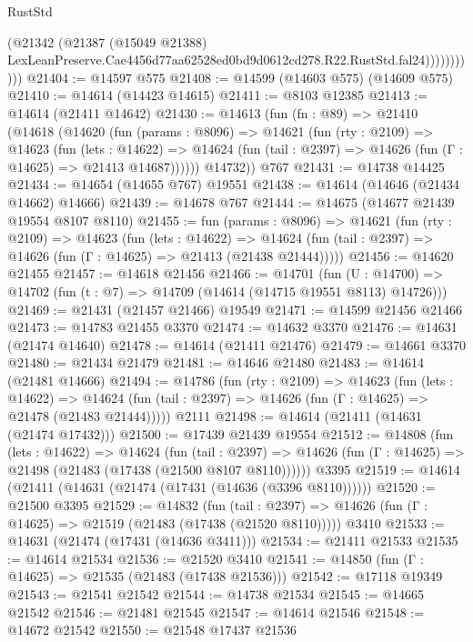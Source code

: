 \begin{lexlean}{RustStd}
\begin{coremodule}
                      (@21342
                        (@21387
                          (@15049 @21388)
                          LexLeanPreserve.Cae4456d77aa62528ed0bd9d0612cd278.R22.RustStd.fal24)))))))))))
@21404 := @14597 @575
@21408 := @14599 (@14603 @575) (@14609 @575)
@21410 := @14614 (@14423 @14615)
@21411 := @8103 @12385
@21413 := @14614 (@21411 @14642)
@21430 := @14613
    (fun (fn : @89) =>
    @21410
      (@14618
        (@14620
          (fun (params : @8096) =>
          @14621
            (fun (rty : @2109) =>
            @14623
              (fun (lets : @14622) =>
              @14624 (fun (tail : @2397) => @14626 (fun (Γ : @14625) => @21413 @14687))))))
        @14732))
    @767
@21431 := @14738 @14425
@21434 := @14654 (@14655 @767) @19551
@21438 := @14614 (@14646 (@21434 @14662) @14666)
@21439 := @14678 @767
@21444 := @14675 (@14677 @21439 @19554 @8107 @8110)
@21455 := fun (params : @8096) =>
  @14621
    (fun (rty : @2109) =>
    @14623
      (fun (lets : @14622) =>
      @14624 (fun (tail : @2397) => @14626 (fun (Γ : @14625) => @21413 (@21438 @21444)))))
@21456 := @14620 @21455
@21457 := @14618 @21456
@21466 := @14701
    (fun (U : @14700) => @14702 (fun (t : @7) => @14709 (@14614 (@14715 @19551 @8113) @14726)))
@21469 := @21431 (@21457 @21466) @19549
@21471 := @14599 @21456 @21466
@21473 := @14783 @21455 @3370
@21474 := @14632 @3370
@21476 := @14631 (@21474 @14640)
@21478 := @14614 (@21411 @21476)
@21479 := @14661 @3370
@21480 := @21434 @21479
@21481 := @14646 @21480
@21483 := @14614 (@21481 @14666)
@21494 := @14786
    (fun (rty : @2109) =>
    @14623
      (fun (lets : @14622) =>
      @14624 (fun (tail : @2397) => @14626 (fun (Γ : @14625) => @21478 (@21483 @21444)))))
    @2111
@21498 := @14614 (@21411 (@14631 (@21474 @17432)))
@21500 := @17439 @21439 @19554
@21512 := @14808
    (fun (lets : @14622) =>
    @14624
      (fun (tail : @2397) =>
      @14626 (fun (Γ : @14625) => @21498 (@21483 (@17438 (@21500 @8107 @8110))))))
    @3395
@21519 := @14614 (@21411 (@14631 (@21474 (@17431 (@14636 (@3396 @8110))))))
@21520 := @21500 @3395
@21529 := @14832
    (fun (tail : @2397) => @14626 (fun (Γ : @14625) => @21519 (@21483 (@17438 (@21520 @8110)))))
    @3410
@21533 := @14631 (@21474 (@17431 (@14636 @3411)))
@21534 := @21411 @21533
@21535 := @14614 @21534
@21536 := @21520 @3410
@21541 := @14850 (fun (Γ : @14625) => @21535 (@21483 (@17438 @21536)))
@21542 := @17118 @19349
@21543 := @21541 @21542
@21544 := @14738 @21534
@21545 := @14665 @21542
@21546 := @21481 @21545
@21547 := @14614 @21546
@21548 := @14672 @21542
@21550 := @21548 @17437 @21536

\end{coremodule}
\end{lexlean}
